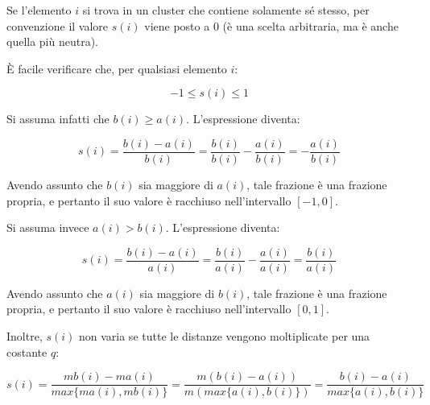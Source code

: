 \documentclass[a4paper, 12pt]{report}
\begin{document}
			Se l'elemento $i$ si trova in un cluster che contiene solamente sé stesso,
			per convenzione il valore $s(i)$ viene posto a $0$ (è una scelta arbitraria,
			ma è anche quella più neutra).

			È facile verificare che, per qualsiasi elemento $i$:

			\begin{equation*}
				-1 \leq s(i) \leq 1
			\end{equation*}

			Si assuma infatti che $b(i) \geq a(i)$. L'espressione diventa:

			\begin{equation*}
				s(i) = \frac{b(i) - a(i)}{b(i)} =
				\frac{b(i)}{b(i)} - \frac{a(i)}{b(i)} =
				- \frac{a(i)}{b(i)}
			\end{equation*}

			Avendo assunto che $b(i)$ sia maggiore di $a(i)$, tale frazione è una
			frazione propria, e pertanto il suo valore è racchiuso nell'intervallo
			$[-1, 0]$.

			Si assuma invece $a(i) > b(i)$. L'espressione diventa:

			\begin{equation*}
				s(i) = \frac{b(i) - a(i)}{a(i)} =
				\frac{b(i)}{a(i)} - \frac{a(i)}{a(i)} =
				\frac{b(i)}{a(i)}
			\end{equation*}

			Avendo assunto che $a(i)$ sia maggiore di $b(i)$, tale frazione è una
			frazione propria, e pertanto il suo valore è racchiuso nell'intervallo
			$[0, 1]$.

			Inoltre, $s(i)$ non varia se tutte le distanze vengono moltiplicate
			per una costante $q$:

			\begin{equation*}
				s(i) = \frac{m b(i) - m a(i)}{max\{m a(i), m b(i)\}} =
				\frac{m(b(i) - a(i))}{m(max\{a(i), b(i)\})} =
				\frac{b(i) - a(i)}{max\{a(i), b(i)\}}
			\end{equation*}
\end{document}

